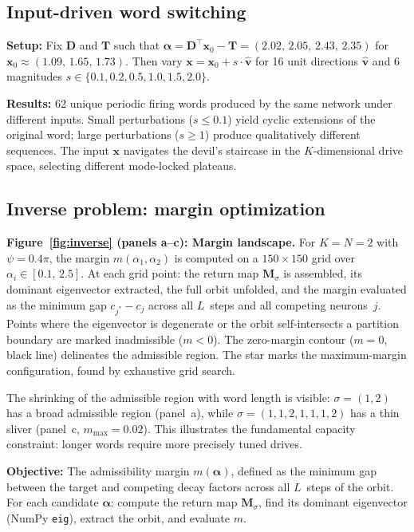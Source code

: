 \documentclass[12pt]{article}
\newcommand{\vv}[1]{\mathbf{#1}}
\newcommand{\xx}{\vv{x}}
\begin{document}
\subsection{Input-driven word switching}\label{app:input-switch}

\textbf{Setup:} Fix $\vv{D}$ and $\vv{T}$ such that $\boldsymbol{\alpha}=\vv{D}^\top\xx_0-\vv{T}=(2.02,\,2.05,\,2.43,\,2.35)$ for $\xx_0\approx(1.09,\,1.65,\,1.73)$. Then vary $\xx=\xx_0+s\cdot\hat{\vv{v}}$ for 16 unit directions $\hat{\vv{v}}$ and 6 magnitudes $s\in\{0.1,0.2,0.5,1.0,1.5,2.0\}$.

\textbf{Results:} 62 unique periodic firing words produced by the same network under different inputs. Small perturbations ($s\leq 0.1$) yield cyclic extensions of the original word; large perturbations ($s\geq 1$) produce qualitatively different sequences. The input $\xx$ navigates the devil's staircase in the $K$-dimensional drive space, selecting different mode-locked plateaus.

\subsection{Inverse problem: margin optimization}\label{app:inverse}

\textbf{Figure~\ref{fig:inverse} (panels a--c): Margin landscape.}
For $K{=}N{=}2$ with $\psi=0.4\pi$, the margin 
$m(\alpha_1,\alpha_2)$ is computed on a $150{\times}150$ grid over 
$\alpha_i\in[0.1,\,2.5]$.  At each grid point: the return map 
$\vv{M}_\sigma$ is assembled, its dominant eigenvector extracted, the 
full orbit unfolded, and the margin evaluated as the minimum gap 
$c_{j^*}-c_j$ across all $L$~steps and all competing neurons~$j$.  
Points where the eigenvector is degenerate or the orbit self-intersects 
a partition boundary are marked inadmissible ($m<0$).  The 
zero-margin contour ($m=0$, black line) delineates the admissible 
region.  The star marks the maximum-margin configuration, found by 
exhaustive grid search.

The shrinking of the admissible region with word length is visible: 
$\sigma=(1,2)$ has a broad admissible region (panel~a), while 
$\sigma=(1,1,2,1,1,1,2)$ has a thin sliver (panel~c, 
$m_{\max}=0.02$).  This illustrates the fundamental capacity 
constraint: longer words require more precisely tuned drives.

\textbf{Objective:} The admissibility margin $m(\boldsymbol{\alpha})$, defined as the minimum gap between the target and competing decay factors across all $L$~steps of the orbit. For each candidate $\boldsymbol{\alpha}$: compute the return map $\vv{M}_\sigma$, find its dominant eigenvector (NumPy \texttt{eig}), extract the orbit, and evaluate $m$.
\end{document}
